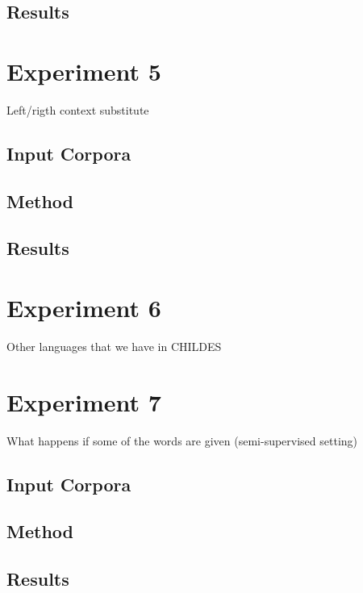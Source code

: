 \subsection{Results}

\section{Experiment 5}
Left/rigth context substitute
\subsection{Input Corpora}
\subsection{Method}
\subsection{Results}

\section{Experiment 6}
Other languages that we have in CHILDES

\section{Experiment 7}
What happens if some of the words are given (semi-supervised setting)

\subsection{Input Corpora}
\subsection{Method}
\subsection{Results}



